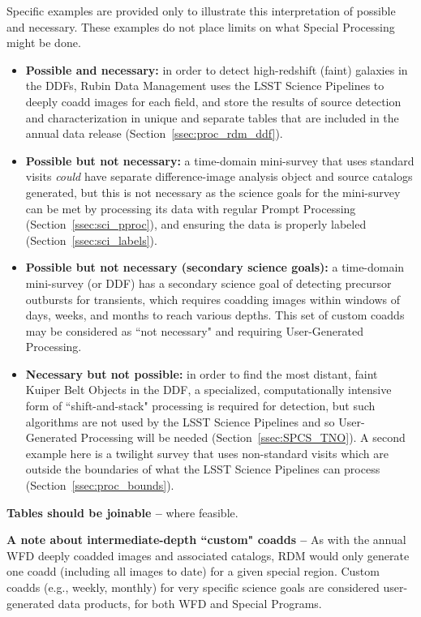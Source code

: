 Specific examples are provided only to illustrate this interpretation of possible and necessary.
These examples do not place limits on what Special Processing might be done.

\begin{itemize}

\item \textbf{Possible and necessary:}
in order to detect high-redshift (faint) galaxies in the DDFs,
Rubin Data Management uses the LSST Science Pipelines to deeply
coadd images for each field, and store the results of source
detection and characterization in unique and separate tables that
are included in the annual data release (Section~\ref{ssec:proc_rdm_ddf}).

\item \textbf{Possible but not necessary:}
a time-domain mini-survey that uses standard visits \emph{could}
have separate difference-image analysis object and source catalogs
generated, but this is not necessary as the science goals for the
mini-survey can be met by processing its data with regular Prompt
Processing (Section~\ref{ssec:sci_pproc}), and ensuring the
data is properly labeled (Section~\ref{ssec:sci_labels}).

\item \textbf{Possible but not necessary (secondary science goals):}
a time-domain mini-survey (or DDF) has a secondary science goal of detecting
precursor outbursts for transients, which requires coadding images
within windows of days, weeks, and months to reach various depths.
This set of custom coadds may be considered as ``not necessary" and requiring 
User-Generated Processing.

\item \textbf{Necessary but not possible:}
in order to find the most distant, faint Kuiper Belt Objects in the DDF,
a specialized, computationally intensive form of ``shift-and-stack" processing
is required for detection, but such algorithms are not used by the 
LSST Science Pipelines and so User-Generated Processing will be needed (Section~\ref{ssec:SPCS_TNO}).
A second example here is a twilight survey that uses non-standard visits 
which are outside the boundaries of what the LSST
Science Pipelines can process (Section~\ref{ssec:proc_bounds}).

\end{itemize}

\textbf{Tables should be joinable -- } where feasible.

\textbf{A note about intermediate-depth ``custom" coadds -- }
As with the annual WFD deeply coadded images and associated catalogs, RDM would 
only generate one coadd (including all images to date) for a given special region.
Custom coadds (e.g., weekly, monthly) for very specific science goals are considered 
user-generated data products, for both WFD and Special Programs.



